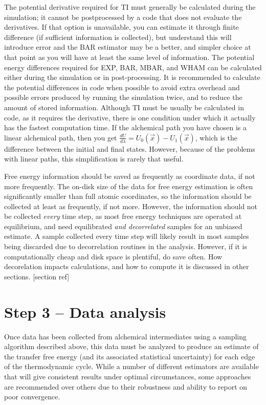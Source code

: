 \documentclass[9pt,bestpractices]{livecoms}
\begin{document}
The potential derivative required for TI must generally be calculated during the simulation; it cannot be postprocessed by a code that does not evaluate the derivatives. 
If that option is unavailable, you can estimate it through finite difference (if sufficient information is collected), but understand this will introduce error and the BAR estimator may be a better, and simpler choice at that point as you will have at least the same level of information. 
The potential energy differences required for EXP, BAR, MBAR, and WHAM can be calculated either during the simulation or in post-processing. It is recommended to calculate the potential differences in code when possible to avoid extra overhead and possible errors produced by running the simulation twice, and to reduce the amount of stored information. 
Although TI must be usually be calculated in code, as it requires the derivative, there is one condition under which it actually has the fastest computation time. 
If the alchemical path you have chosen is a linear alchemical path, then you get $\frac{dU}{d\lambda} = U_0(\vec{x}) - U_1(\vec{x})$, which is the difference between the initial and final states. 
However, because of the problems with linear paths, this simplification is rarely that useful.

Free energy information should be saved as frequently as coordinate data, if not more frequently. 
The on-disk size of the data for free energy estimation is often significantly smaller than full atomic coordinates, so the information should be collected at least as frequently, if not more. 
However, the information should not be collected \textit{every} time step, as most free energy techniques are operated at equilibrium, and need equilibrated \textit{and decorrelated} samples for an unbiased estimate.
A sample collected every time step will likely result in most samples being discarded due to decorrelation routines in the analysis. However, if it is computationally cheap and disk space is plentiful, do save often. 
How decorelation impacts calculations, and how to compute it is discussed in other sections. [section ref]

\section{Step 3 -- Data analysis}
\label{sec:step3}

Once data has been collected from alchemical intermediates using a sampling algorithm described above, this data must be analyzed to produce an estimate of the transfer free energy (and its associated statistical uncertainty) for each edge of the thermodynamic cycle.
While a number of different estimators are available that will give consistent results under optimal circumstances, some approaches are recommended over others due to their robustness and ability to report on poor convergence.
\end{document}
